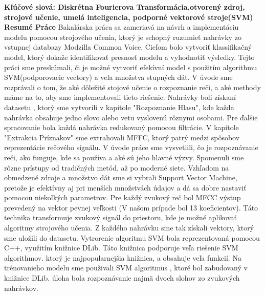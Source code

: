 \documentclass[english,12pt,oneside,a4paper]{article}
\begin{document}
	\textbf{Kľúčové slová: Diskrétna Fourierova Transformácia,otvorený zdroj, strojové učenie, umelá inteligencia, podporné vektorové stroje(SVM)}
	\newpage
	\textbf{Resumé Práce}
	\newline
	Bakalárska práca sa zameriavá na návrh a implementáciu modelu pomocou strojového učenia, ktorý je schopný ruzumieť nahrávky zo vstupnej databazy Modzilla Common Voice. Cieľom bolo vytvoriť klassifikačný model, ktorý dokaže identifikovať presnosť modelu a vyhodnotiť výsledky. Tejto práci sme preskúmali, či je možné vytvoriť efekívní model s použitím algorithmu SVM(podporovacie vectory) a veľa množstva stupných dát. V úvode sme rozprávali o tom, že aké dôležité stojové učenie o rozpoznanie reči, a aké methody máme na to, aby sme implementovali tieto riešenie.  Nahrávky boli získaní datasetu , ktorý sme vytvorili v kapitole "Rozpoznanie Hlasu", kde každa nahrávka obsahuje jedno slovo alebo vetu vyslovenú rôznymi osobami. Pre ďalšie spracovanie bola každá nahrávka redukovaný pomocou filtrácie. V kapitole "Extrakcia Príznakov" sme extrahovali MFFC, ktorý patrý medzi spôsobov reprezentácie rečového signálu.
	V úvode práce sme vysvetlili, čo je rozpoznávanie reči, ako funguje, kde sa používa a aké sú jeho hlavné výzvy. Spomenuli sme rôzne prístupy od tradičných metód, až po moderné siete. Vzhľadom na obmedzené zdroje a množstvo dát sme si vybrali Support Vector Machine, pretože je efektívny aj pri menších množstvách údajov a dá sa dobre nastaviť pomocou niekoľkých parametrov.
	Pre každý zvukový reč bol MFCC výstup prevedený na vektor pevnej veľkosti (V našom prípade bol 13 koeficientov). Táto technika transformuje zvukový signál do priestoru, kde je možné aplikovať algoritmy strojového učenia. Z každého nahrávku sme tak získali vektory, ktorý sme uložili do datasetu. 
	Vytrorenie algoritmu SVM bola reprezentovaná pomocou C++, využitím knižnice DLib. Táto knižnica podporuje veľa riešenie SVM algorithmov. ktorý je najpopularnejšia knižnica, a obsahuje veľa funkcií. Na trénovanieho modelu sme použivali SVM algoritmus , ktoré bol zabudovaný v knižnice DLib. úloha bola rozpoznávanie najmä dvoch slohov zo zvukových nahrávkov.
\end{document}
